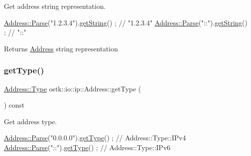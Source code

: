 Get address string representation. 


\begin{DoxyCode}
\hyperlink{classostk_1_1io_1_1ip_1_1_address_a3d60e44d816e30f17db36f9bb7ac6307}{Address::Parse}(\textcolor{stringliteral}{"1.2.3.4"}).\hyperlink{classostk_1_1io_1_1ip_1_1_address_a3dde4b2601d3c2be6a6ab6af3663fa1a}{getString}() ; \textcolor{comment}{// "1.2.3.4"}
\hyperlink{classostk_1_1io_1_1ip_1_1_address_a3d60e44d816e30f17db36f9bb7ac6307}{Address::Parse}(\textcolor{stringliteral}{"::"}).\hyperlink{classostk_1_1io_1_1ip_1_1_address_a3dde4b2601d3c2be6a6ab6af3663fa1a}{getString}() ; \textcolor{comment}{// "::"}
\end{DoxyCode}


\begin{DoxyReturn}{Returns}
\hyperlink{classostk_1_1io_1_1ip_1_1_address}{Address} string representation 
\end{DoxyReturn}
\mbox{\label{classostk_1_1io_1_1ip_1_1_address_ab1e396075b2db78542e9312479c9a9a5}} 
\subsubsection{\texorpdfstring{get\+Type()}{getType()}}
{\footnotesize\ttfamily \hyperlink{classostk_1_1io_1_1ip_1_1_address_a03b78ae8f7ddbb893d7396e6a1baf695}{Address\+::\+Type} ostk\+::io\+::ip\+::\+Address\+::get\+Type (\begin{DoxyParamCaption}{ }\end{DoxyParamCaption}) const}



Get address type. 


\begin{DoxyCode}
\hyperlink{classostk_1_1io_1_1ip_1_1_address_a3d60e44d816e30f17db36f9bb7ac6307}{Address::Parse}(\textcolor{stringliteral}{"0.0.0.0"}).\hyperlink{classostk_1_1io_1_1ip_1_1_address_ab1e396075b2db78542e9312479c9a9a5}{getType}() ; \textcolor{comment}{// Address::Type::IPv4}
\hyperlink{classostk_1_1io_1_1ip_1_1_address_a3d60e44d816e30f17db36f9bb7ac6307}{Address::Parse}(\textcolor{stringliteral}{"::"}).\hyperlink{classostk_1_1io_1_1ip_1_1_address_ab1e396075b2db78542e9312479c9a9a5}{getType}() ; \textcolor{comment}{// Address::Type::IPv6}
\end{DoxyCode}


